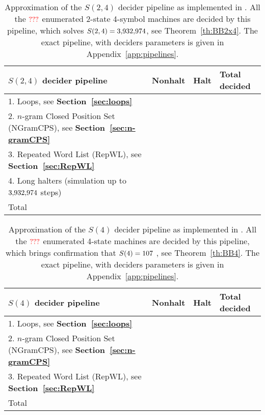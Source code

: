 \begin{table}[h!]
    \centering
    \begin{tabular}{|l|lll|}
        \hline
        $S(2,4)$ decider pipeline                                                            & Nonhalt  & Halt     & Total decided \\
        \hline
        1. Loops, see \textbf{Section~\ref{sec:loops}}                                       & \ts{???} & \ts{???} & \ts{???}      \\
        2. $n$-gram Closed Position Set (NGramCPS), see \textbf{Section~\ref{sec:n-gramCPS}} & \ts{???} & \ts{???} & \ts{???}      \\
        3. Repeated Word List (RepWL), see \textbf{Section~\ref{sec:RepWL}}                  & \ts{???} & \ts{???} & \ts{???}      \\
        4. Long halters (simulation up to $3{,}932{,}974$ steps)                                    & \ts{???} & \ts{???} & \ts{???}      \\
        \hline
        Total                                                                                & \ts{???} & \ts{???} & \ts{???}      \\ \hline
    \end{tabular}
    \caption{Approximation of the $S(2,4)$ decider pipeline as implemented in \CoqBB. All the ${\color{red}???}$ enumerated 2-state 4-symbol machines are decided by this pipeline, which solves $S(2,4) = 3{,}932{,}974$, see Theorem~\ref{th:BB2x4}. The exact pipeline, with deciders parameters is given in Appendix~\ref{app:pipelines}. }\label{tab:pipelineBB2x4}
\end{table}

\begin{table}[h!]
    \centering
    \begin{tabular}{|l|lll|}
        \hline
        $S(4)$ decider pipeline                                                              & Nonhalt  & Halt     & Total decided \\
        \hline
        1. Loops, see \textbf{Section~\ref{sec:loops}}                                       & \ts{???} & \ts{???} & \ts{???}      \\
        2. $n$-gram Closed Position Set (NGramCPS), see \textbf{Section~\ref{sec:n-gramCPS}} & \ts{???} & \ts{???} & \ts{???}      \\
        3. Repeated Word List (RepWL), see \textbf{Section~\ref{sec:RepWL}}                  & \ts{???} & \ts{???} & \ts{???}      \\
        \hline
        Total                                                                                & \ts{???} & \ts{???} & \ts{???}      \\
        \hline
    \end{tabular}
    \caption{Approximation of the $S(4)$ decider pipeline as implemented in \CoqBB. All the ${\color{red}???}$ enumerated 4-state machines are decided by this pipeline, which brings confirmation that $S(4) = 107$ \cite{Brady83}, see Theorem~\ref{th:BB4}. The exact pipeline, with deciders parameters is given in Appendix~\ref{app:pipelines}. }\label{tab:pipelineBB4}
\end{table}